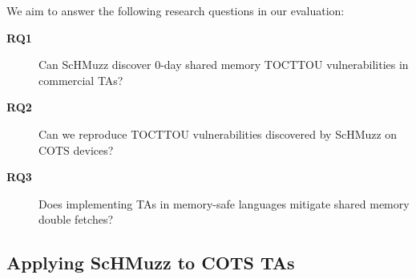 \documentclass[conference]{IEEEtran}
\newcommand{\sysname}{ScHMuzz\xspace}
\begin{document}



We aim to answer the following research questions in our evaluation:
\begin{description}

        \item[\textbf{RQ1}] Can \sysname discover 0-day shared memory TOCTTOU vulnerabilities in commercial TAs?

        \item[\textbf{RQ2}] Can we reproduce TOCTTOU vulnerabilities discovered by \sysname on COTS devices? 
        
        \item[\textbf{RQ3}] Does implementing TAs in memory-safe languages mitigate shared memory double fetches?

\end{description}


\subsection{Applying \sysname to COTS TAs}\label{sec:cotsfuzz}
\end{document}
